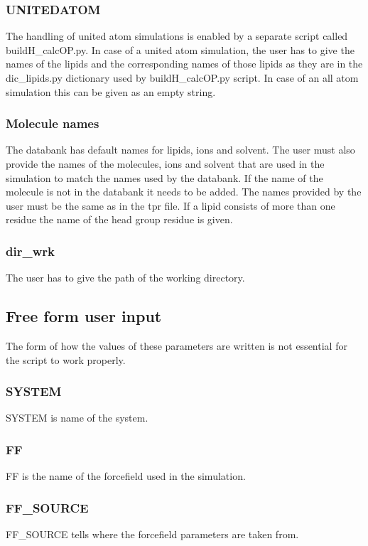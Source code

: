 \documentclass[12pt,a4paper]{article}
\begin{document}
\subsubsection*{UNITEDATOM}
The handling of united atom simulations is enabled by a separate script called buildH\_calcOP.py. In case of a united atom simulation, the user has to give the names of the lipids and the corresponding names of those lipids as they are in the dic\_lipids.py dictionary used by buildH\_calcOP.py script. In case of an all atom simulation this can be given as an empty string.

\subsubsection*{Molecule names}
The databank has default names for lipids, ions and solvent. The user must also provide the names of the molecules, ions and solvent that are used in the simulation to match the names used by the databank. If the name of the molecule is not in the databank it needs to be added. The names provided by the user must be the same as in the tpr file. If a lipid consists of more than one residue the name of the head group residue is given.

\subsubsection*{dir\_wrk}
The user has to give the path of the working directory.

\subsection*{Free form user input}
The form of how the values of these parameters are written is not essential for the script to work properly.
\subsubsection*{SYSTEM}
SYSTEM is name of the system.
\subsubsection*{FF}
FF is the name of the forcefield used in the simulation.
\subsubsection*{FF\_SOURCE}
FF\_SOURCE tells where the forcefield parameters are taken from.
\end{document}

